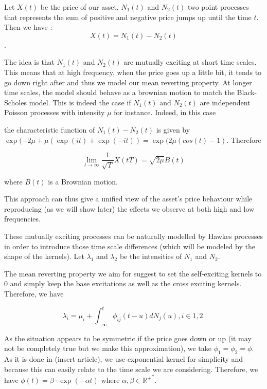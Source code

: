 \documentclass[a4paper,12pt,twoside]{article}
\begin{document}
Let $X(t)$ be the price of our asset, $N_1(t)$ and $N_2(t)$ two point processes that represents the sum of positive and negative price jumps up until the time $t$. Then we have : \begin{equation} X(t) = N_1(t) - N_2(t) \end{equation}. 

The idea is that $N_1(t)$ and $N_2(t)$ are mutually exciting at short time scales. This means that at high frequency, when the price goes up a little bit, it tends to go down right after and thus we model our mean reverting property. At longer time scales, the model should behave as a brownian motion to match the Black-Scholes model. This is indeed the case if $N_1(t)$ and $N_2(t)$ are independent Poisson processes with intensity $\mu$ for instance.
Indeed, in this case 

the characteristic function of $N_1(t) - N_2(t)$ is given by $\exp(-2\mu + \mu(\exp(it) + \exp(-it)) = \exp(2\mu(cos(t) - 1)$. Therefore 

\begin{equation}
\lim_{t \to \infty} \frac{1}{\sqrt{T}}X(tT) = \sqrt{2\mu}B(t)
\end{equation}

where $B(t)$ is a Brownian motion.

This approach can thus give a unified view of the asset's price behaviour while reproducing (as we will show later) the effects we observe at both high and low frequencies.

These mutually exciting processes can be naturally modelled by Hawkes processes in order to introduce those time scale differences (which will be modeled by the shape of the kernels). Let $\lambda_1$ and $\lambda_2$ be the intensities of $N_1$ and $N_2$. 

The mean reverting property we aim for suggest to set the self-exciting kernels to 0 and simply keep the base excitations as well as the cross exciting kernels. Therefore, we have 

\begin{equation} \lambda_i = \mu_i + \int_{-\infty}^{t} \phi_{ij}(t-u)dN_j(u), i \in {1, 2}.
\end{equation}

As the situation appears to be symmetric if the price goes down or up (it may not be completely true but we make this approximation), we take $\phi_1 = \phi_2 = \phi$. As it is done in (insert article), we use exponential kernel for simplicity and because this can easily relate to the time scale we are considering. Therefore, we have $\phi(t) = \beta \cdot \exp(-\alpha t)$ where $\alpha, \beta \in \mathbb{{R^{+}}^*}$.
\end{document}
